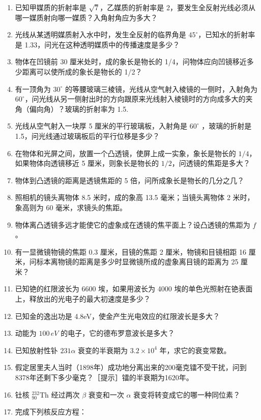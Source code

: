 \begin{enumerate}
\item
  已知甲媒质的折射率是 \(\sqrt{7}\)，乙媒质的折射率是
  2，要发生全反射光线必须从哪一媒质射向哪一媒质？入角射角应为多大？
\item
  光线从某透明媒质射入水中时，发生全反射的临界角是
  \(45^{\circ}\)，已知水的折射率是
  1.33，问光在这种透明媒质中的传播速度是多少？
\item
  物体在凹镜前 30 厘米处时，成的象长是物长的
  1/4，问物体应向凹镜移近多少距离可以使所成的象长是物长的 1/2？
\item
  有一顶角为 \(30^{\circ}\)
  的等腰玻璃三棱镜，光线从空气射入棱镜的一侧时，入射角为
  \(60^{\circ}\)，问光线从另一侧射出时的方向跟原来光线射入棱镜时的方向成多大的夹角（偏向角）？玻璃的折射率为
  1.5.
\item
  光线从空气射入一块厚 5 厘米的平行玻璃板，入射角是 \(60^{\circ}\)
  ，玻璃的折射是 1.5，问光线通过玻璃板后的平行位移是多少？
\item
  在物体和光屏之间，放置一个凸透镜，使屏上成一实象，象长是物长的
  \(1 / 4\)，如果物体向透镜移近 5 厘米，则象长是物长的
  \(1 / 2\)，问透镜的焦距是多大？
\item
  物体到凸透镜的距离是透镜焦距的 5 倍，问所成象长是物长的几分之几？
\item
  照相机的镜头离物体 8.5 米时，成的象高 13.5 毫米；当镜头离物体 2
  米时，象高则为 60 毫米，求镜头的焦距。
\item
  物体离凸透镜多远才能使它的虚象成在透镜的焦平面上？设凸透镜的焦距为
  \(f\)。
\item
  有一显微镜物镜的焦距 0.3 厘米，目镜的焦距 2 厘米，物镜和目镜相距 16
  厘米，问标本离物镜的距离是多少时显微镜所成的虚象离目镜的距离为 25
  厘米？
\item
  已知铯的红限波长为 6600 埃，如果用波长为 4000
  埃的单色光照射在铯表面上，释放出的光电子的最大初速度是多少？
\item
  已知金的逸出功是 4.8eV，使金产生光电效应的红限波长是多大？
\item
  动能为 \(100 \, eV\) 的电子，它的德布罗意波长是多大？
\item
  已知放射性钋 \(231\alpha\) 衰变的半衰期为 \(3.2 \times 10^{4}\)
  年，求它的衰变常数。
\item
  假定居里夫人当时（1898年）成功地分离出来的200毫克镭不受干扰，问到8378年还剩下多少毫克？［提示］镭的半衰期为1620年。
\item
  钍核 \({}^{232}_{90}\mathrm{Th}\) 经过两次 \(\beta\) 衰变和一次
  \(\alpha\) 衰变将转变成它的哪一种同位素？
\item
  完成下列核反应方程：
\end{enumerate}

